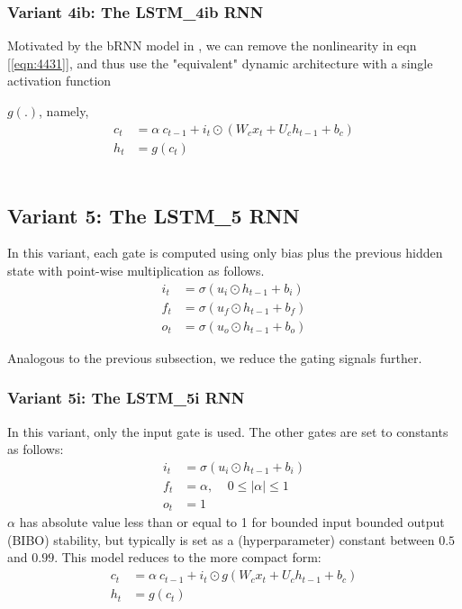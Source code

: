 \documentclass{article}
\begin{document}
\subsubsection{Variant 4ib: The LSTM\_4ib RNN}
Motivated by the bRNN model in \cite {salem2016basic}, we can remove the nonlinearity in eqn [\ref{eqn:4431}], and thus use the "equivalent" dynamic architecture with a single activation function {$g(.)$, namely,
\begin{align}
	\label{eqn:431}	c_t &=  \alpha ~ c_{t-1} + i_t \odot (W_c x_t + U_c h_{t-1} + b_c)\\
	\label{eqn:441}	h_t &=  g(c_t)
\end{align}
\\
\subsection{Variant 5: The LSTM\_5 RNN}
In this variant, each gate is computed using only bias plus the previous hidden state with point-wise multiplication as follows.
\begin{align}
	i_t &= \sigma(u_i \odot  h_{t-1} + b_i)\\
	f_t &= \sigma(u_f \odot h_{t-1} + b_f)\\
	o_t &= \sigma(u_o \odot  h_{t-1} + b_o)
\end{align}

Analogous to the previous subsection, we reduce the gating signals further.

\subsubsection{Variant 5i: The LSTM\_5i RNN}
In this variant, only the input gate is used. The other gates are set to constants as follows:
\begin{align}
	i_t &= \sigma(u_i \odot  h_{t-1} + b_i)\\
	f_t &= \alpha , ~~~~~  0 \leq |\alpha| \leq  1 \\
	o_t &= 1
\end{align}
$\alpha$ has absolute value less than or equal to 1 for bounded input bounded output (BIBO) stability, but typically is set as a (hyperparameter) constant between $0.5$ and $0.99$.
This model reduces to the more compact form:
\begin{align}
	\label{eqn:5531}	c_t &=  \alpha ~ c_{t-1} + i_t \odot g(W_c x_t + U_c h_{t-1} + b_c)\\
	\label{eqn:5541}	h_t &=  g(c_t)
\end{align}

}
\end{document}
